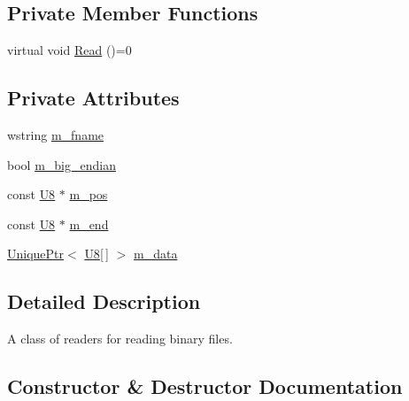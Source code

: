 \subsection*{Private Member Functions}
\begin{DoxyCompactItemize}
\item 
virtual void \hyperlink{classmage_1_1_binary_reader_a5c060c165f17a71f4218eb98c7091273}{Read} ()=0
\end{DoxyCompactItemize}
\subsection*{Private Attributes}
\begin{DoxyCompactItemize}
\item 
wstring \hyperlink{classmage_1_1_binary_reader_a9c97c02d53ce60a9952751ad4f55414f}{m\+\_\+fname}
\item 
bool \hyperlink{classmage_1_1_binary_reader_a8d23fde958e08efe248edb5d92861113}{m\+\_\+big\+\_\+endian}
\item 
const \hyperlink{namespacemage_afc638980bc6154f15af5e2d93a0e0ea9}{U8} $\ast$ \hyperlink{classmage_1_1_binary_reader_aedb9632de1cf95d5af49499217744ed5}{m\+\_\+pos}
\item 
const \hyperlink{namespacemage_afc638980bc6154f15af5e2d93a0e0ea9}{U8} $\ast$ \hyperlink{classmage_1_1_binary_reader_a19b0f36cb1e8a05aaa9471514242e8ef}{m\+\_\+end}
\item 
\hyperlink{namespacemage_a3316d7143a973e37adf1110f2e80ca31}{Unique\+Ptr}$<$ \hyperlink{namespacemage_afc638980bc6154f15af5e2d93a0e0ea9}{U8}\mbox{[}$\,$\mbox{]} $>$ \hyperlink{classmage_1_1_binary_reader_a529bdcb620e1250aa0b12716c9b7eae1}{m\+\_\+data}
\end{DoxyCompactItemize}


\subsection{Detailed Description}
A class of readers for reading binary files. 

\subsection{Constructor \& Destructor Documentation}
\hypertarget{classmage_1_1_binary_reader_a42e6c31bc53f5214675f845756b5a404}{}\label{classmage_1_1_binary_reader_a42e6c31bc53f5214675f845756b5a404} 
